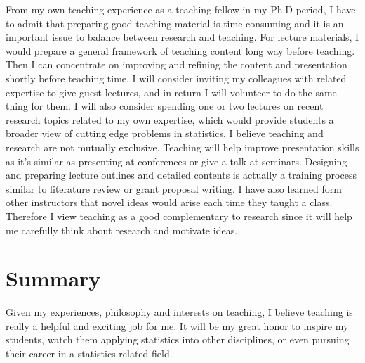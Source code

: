 \documentclass[12pt]{amsart} \usepackage{amssymb}
\begin{document}
From my own teaching experience as a teaching fellow in my Ph.D period,
I have to admit that preparing good teaching material is time consuming and it is an important issue to balance between research and teaching.
For lecture materials, I would prepare a general framework of teaching content long way before teaching.
Then I can concentrate on improving and refining the content and presentation shortly before teaching time.
I will consider inviting my colleagues with related expertise to give guest lectures, 
and in return I will volunteer to do the same thing for them.
I will also consider spending one or two lectures on recent research topics related to my own expertise, 
which would provide students a broader view of cutting edge problems in statistics.
I believe teaching and research are not  mutually exclusive.
Teaching will help improve presentation skills as it's similar as presenting at conferences or give a talk at seminars.
Designing and preparing lecture outlines and detailed contents is actually a training process similar to literature review or grant proposal writing.
I have also learned form other instructors that novel ideas would arise each time they taught a class.
Therefore I view teaching as a good complementary to research since it will help me carefully think about research and motivate ideas.

\section{Summary}
Given my experiences, philosophy and interests on teaching,
I believe teaching is really a helpful and exciting job for me.
It will be my great honor to inspire my students,
watch them applying statistics into other disciplines,
or even pursuing their career in a statistics related field. 
\end{document}
